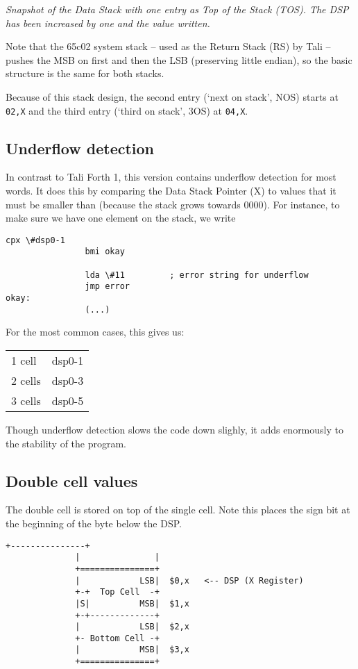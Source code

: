 \textit{Snapshot of the Data Stack with one entry as Top of the Stack (TOS). The
DSP has been increased by one and the value written.}

Note that the 65c02 system stack -- used as the Return Stack (RS) by Tali --
pushes the MSB on first and then the LSB (preserving little endian), so the
basic structure is the same for both stacks. 

Because of this stack design, the second entry (`next on stack', NOS) starts at
\texttt{02,X} and the third entry (`third on stack', 3OS) at \texttt{04,X}. 

\subsection{Underflow detection} 
In contrast to Tali Forth 1, this version contains underflow detection for most
words. It does this by comparing the Data Stack Pointer (X) to values that it
must be smaller than (because the stack grows towards 0000). For instance, to
make sure we have one element on the stack, we write

\begin{lstlisting}[frame=single]
                cpx \#dsp0-1
                bmi okay

                lda \#11         ; error string for underflow
                jmp error
okay:
                (...)
\end{lstlisting}

For the most common cases, this gives us:

\begin{tabular}{ l c }
        1  cell   &  dsp0-1\\
        2  cells  &  dsp0-3\\
        3  cells  &  dsp0-5\\
\end{tabular}

Though underflow detection slows the code down slighly, it adds enormously to
the stability of the program.

\subsection{Double cell values}

The double cell is stored on top of the single cell.
Note this places the sign bit at the beginning of the byte below the DSP.

\begin{lstlisting}[frame=single]
              +---------------+
              |               |  
              +===============+  
              |            LSB|  $0,x   <-- DSP (X Register) 
              +-+  Top Cell  -+         
              |S|          MSB|  $1,x
              +-+-------------+ 
              |            LSB|  $2,x
              +- Bottom Cell -+         
              |            MSB|  $3,x   
              +===============+ 
\end{lstlisting}

